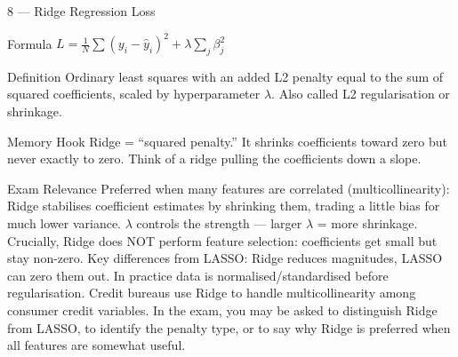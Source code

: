 \documentclass[aspectratio=169,8pt]{beamer}
\begin{document}
	\begin{frame}{8 --- Ridge Regression Loss}
		\begin{block}{Formula}
			$L = \frac{1}{N}\sum(y_i - \hat{y}_i)^2 + \lambda\sum_j \beta_j^2$
		\end{block}
		\begin{block}{Definition}
			Ordinary least squares with an added L2 penalty equal to the sum of squared coefficients, scaled by hyperparameter $\lambda$. Also called L2 regularisation or shrinkage.
		\end{block}
		\begin{block}{Memory Hook}
			Ridge = ``squared penalty.'' It shrinks coefficients toward zero but never exactly to zero. Think of a ridge pulling the coefficients down a slope.
		\end{block}
		\begin{block}{Exam Relevance}
			Preferred when many features are correlated (multicollinearity): Ridge stabilises coefficient estimates by shrinking them, trading a little bias for much lower variance. $\lambda$ controls the strength --- larger $\lambda$ = more shrinkage. Crucially, Ridge does NOT perform feature selection: coefficients get small but stay non-zero. Key differences from LASSO: Ridge reduces magnitudes, LASSO can zero them out. In practice data is normalised/standardised before regularisation. Credit bureaus use Ridge to handle multicollinearity among consumer credit variables. In the exam, you may be asked to distinguish Ridge from LASSO, to identify the penalty type, or to say why Ridge is preferred when all features are somewhat useful.
		\end{block}
	\end{frame}
	
\end{document}
